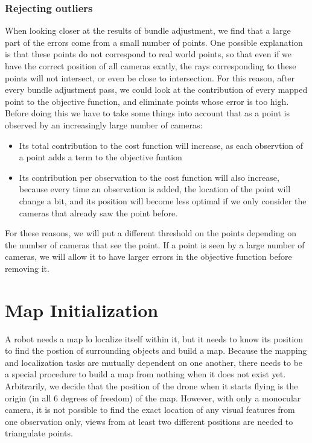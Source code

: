 \subsubsection{Rejecting outliers}
When looking closer at the results of bundle adjustment, we find that a large part of the errors come from a small number of points. One possible explanation is that these points do not correspond to real world points, so that even if we have the correct position of all cameras exatly, the rays corresponding to these points will not intersect, or even be close to intersection. For this reason, after every bundle adjustment pass, we could look at the contribution of every mapped point to the objective function, and eliminate points whose error is too high. Before doing this we have to take some things into account that as a point is observed by an increasingly large number of cameras:
\begin{itemize}
  \item Its total contribution to the cost function will increase, as each observtion of a point adds a term to the objective funtion
  \item Its contribution per observation to the cost function will also increase, because every time an observation is added, the location of the point will change a bit, and its position will become less optimal if we only consider the cameras that already saw the point before.
\end{itemize}
For these reasons, we will put a different threshold on the points depending on the number of cameras that see the point. If a point is seen by a large number of cameras, we will allow it to have larger errors in the objective function before removing it.











\section{Map Initialization}
A robot needs a map lo localize itself within it, but it needs to know its position to find the postion of surrounding objects and build a map. Because the mapping and localization tasks are mutually dependent on one another, there needs to be a special procedure to build a map from nothing when it does not exist yet. Arbitrarily, we decide that the position of the drone when it starts flying is the origin (in all 6 degrees of freedom) of the map. However, with only a monocular camera, it is not possible to find the exact location of any visual features from one observation only, views from at least two different positions are needed to triangulate points.


